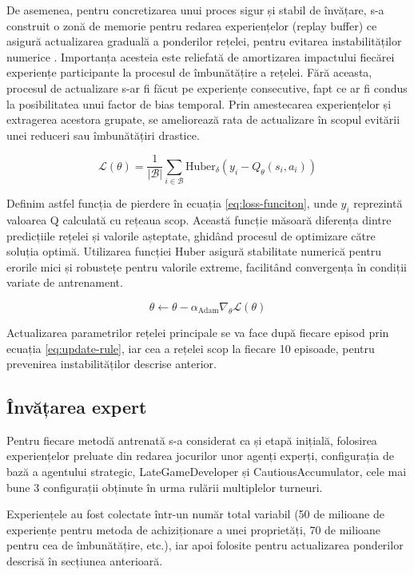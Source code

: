De asemenea, pentru concretizarea unui proces sigur și stabil de învățare, s-a construit o zonă de memorie pentru redarea experiențelor (replay buffer) ce asigură actualizarea graduală a ponderilor rețelei, pentru evitarea instabilităților numerice \cite{lazyprogrammer_replay_buffer}. Importanța acesteia este reliefată de amortizarea impactului fiecărei experiențe participante la procesul de îmbunătățire a rețelei. Fără aceasta, procesul de actualizare s-ar fi făcut pe experiențe consecutive, fapt ce ar fi condus la posibilitatea unui factor de bias temporal. Prin amestecarea experiențelor și extragerea acestora grupate, se ameliorează rata de actualizare în scopul evitării unei reduceri sau îmbunătățiri drastice.

\begin{equation}\label{eq:loss-funciton}
    \mathcal{L}(\theta) = \frac{1}{|\mathcal{B}|} \sum_{i \in \mathcal{B}} \text{Huber}_\delta(y_i - Q_\theta(s_i, a_i))
\end{equation}

Definim astfel funcția de pierdere în ecuația \ref{eq:loss-funciton}, unde $y_i$ reprezintă valoarea Q calculată cu rețeaua scop. Această funcție măsoară diferența dintre predicțiile rețelei și valorile așteptate, ghidând procesul de optimizare către soluția optimă. Utilizarea funcției Huber asigură stabilitate numerică pentru erorile mici și robustețe pentru valorile extreme, facilitând convergența în condiții variate de antrenament.

\begin{equation}\label{eq:update-rule}
    \theta \leftarrow \theta - \alpha_{\text{Adam}} \nabla_\theta \mathcal{L}(\theta)
\end{equation}

Actualizarea parametrilor rețelei principale se va face după fiecare episod prin ecuația \ref{eq:update-rule}, iar cea a rețelei scop la fiecare 10 episoade, pentru prevenirea instabilităților descrise anterior.

\subsection{Învățarea expert}
Pentru fiecare metodă antrenată s-a considerat ca și etapă inițială, folosirea experiențelor preluate din redarea jocurilor unor agenți experți, configurația de bază a agentului strategic, LateGameDeveloper și CautiousAccumulator, cele mai bune 3 configurații obținute în urma rulării multiplelor turneuri.

Experiențele au fost colectate într-un număr total variabil (50 de milioane de experiențe pentru metoda de achiziționare a unei proprietăți, 70 de milioane pentru cea de îmbunătățire, etc.), iar apoi folosite pentru actualizarea ponderilor descrisă în secțiunea anterioară.

